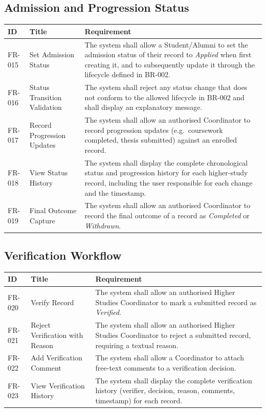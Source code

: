 \documentclass[11pt,a4paper]{article}
\begin{document}
\subsection{Admission and Progression Status}
\begin{tabularx}{\textwidth}{@{}p{1.6cm} p{4.0cm} Y@{}}
\caption{Functional requirements -- Admission and Progression Status.}
\label{tab:fr-status}
\toprule
\textbf{ID} & \textbf{Title} & \textbf{Requirement} \\
\midrule
FR-015 & Set Admission Status &
  The system shall allow a Student/Alumni to set the admission status of their record to \emph{Applied} when first creating it, and to subsequently update it through the lifecycle defined in BR-002. \\
FR-016 & Status Transition Validation &
  The system shall reject any status change that does not conform to the allowed lifecycle in BR-002 and shall display an explanatory message. \\
FR-017 & Record Progression Updates &
  The system shall allow an authorised Coordinator to record progression updates (e.g.\ coursework completed, thesis submitted) against an enrolled record. \\
FR-018 & View Status History &
  The system shall display the complete chronological status and progression history for each higher-study record, including the user responsible for each change and the timestamp. \\
FR-019 & Final Outcome Capture &
  The system shall allow an authorised Coordinator to record the final outcome of a record as \emph{Completed} or \emph{Withdrawn}. \\
\bottomrule
\end{tabularx}

\subsection{Verification Workflow}
\begin{tabularx}{\textwidth}{@{}p{1.6cm} p{4.0cm} Y@{}}
\caption{Functional requirements -- Verification Workflow.}
\label{tab:fr-verify}
\toprule
\textbf{ID} & \textbf{Title} & \textbf{Requirement} \\
\midrule
FR-020 & Verify Record &
  The system shall allow an authorised Higher Studies Coordinator to mark a submitted record as \emph{Verified}. \\
FR-021 & Reject Verification with Reason &
  The system shall allow an authorised Higher Studies Coordinator to reject a submitted record, requiring a textual reason. \\
FR-022 & Add Verification Comment &
  The system shall allow a Coordinator to attach free-text comments to a verification decision. \\
FR-023 & View Verification History &
  The system shall display the complete verification history (verifier, decision, reason, comments, timestamp) for each record. \\
\bottomrule
\end{tabularx}
\end{document}
